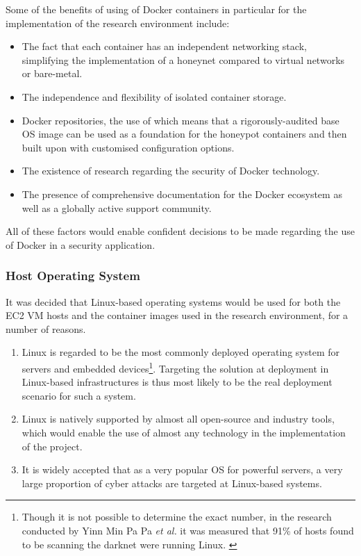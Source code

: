Some of the benefits of using of Docker containers in particular for the implementation of the research environment include:
\begin{itemize}
\item The fact that each container has an independent networking stack, simplifying the implementation of a honeynet compared to virtual networks or bare-metal.
\item The independence and flexibility of isolated container storage.
\item Docker repositories, the use of which means that a rigorously-audited base OS image can be used as a foundation for the honeypot containers and then built upon with customised configuration options.
\item The existence of research regarding the security of Docker technology. \cite{ExperimentingWithDocker} 
\item The presence of comprehensive documentation for the Docker ecosystem as well as a globally active support community. 
\end{itemize}

All of these factors would enable confident decisions to be made regarding the use of Docker in a security application.

\subsubsection{Host Operating System}
It was decided that Linux-based operating systems would be used for both the EC2 VM hosts and the container images used in the research environment, for a number of reasons.

\begin{enumerate}
\item Linux is regarded to be the most commonly deployed operating system for servers and embedded devices\footnote{Though it is not possible to determine the exact number, in the research conducted by Yinn Min Pa Pa \textit{et al.} it was measured that 91\% of hosts found to be scanning the darknet were running Linux. \cite{IoTPot2016}}.  Targeting the solution at deployment in Linux-based infrastructures is thus most likely to be the real deployment scenario for such a system.
\item Linux is natively supported by almost all open-source and industry tools, which would enable the use of almost any technology in the implementation of the project.
\item It is widely accepted that as a very popular OS for powerful servers, a very large proportion of cyber attacks are targeted at Linux-based systems.
\end{enumerate}
%
